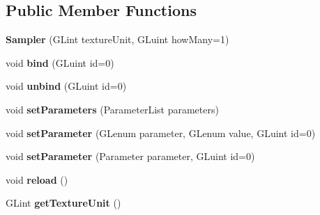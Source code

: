 \subsection*{Public Member Functions}
\begin{DoxyCompactItemize}
\item 
\hypertarget{classfillwave_1_1core_1_1Sampler_a10488b331fc0216c694fd8144d8ff38b}{}{\bfseries Sampler} (G\+Lint texture\+Unit, G\+Luint how\+Many=1)\label{classfillwave_1_1core_1_1Sampler_a10488b331fc0216c694fd8144d8ff38b}

\item 
\hypertarget{classfillwave_1_1core_1_1Sampler_ae5098e4e8df2bb3de2be700207a90ba7}{}void {\bfseries bind} (G\+Luint id=0)\label{classfillwave_1_1core_1_1Sampler_ae5098e4e8df2bb3de2be700207a90ba7}

\item 
\hypertarget{classfillwave_1_1core_1_1Sampler_ad49ae1cadd157b6a61189e4a3a483322}{}void {\bfseries unbind} (G\+Luint id=0)\label{classfillwave_1_1core_1_1Sampler_ad49ae1cadd157b6a61189e4a3a483322}

\item 
\hypertarget{classfillwave_1_1core_1_1Sampler_a59b0527350b74fd14a8bd96735d60925}{}void {\bfseries set\+Parameters} (Parameter\+List parameters)\label{classfillwave_1_1core_1_1Sampler_a59b0527350b74fd14a8bd96735d60925}

\item 
\hypertarget{classfillwave_1_1core_1_1Sampler_a39a21e4b22cd69868f4c2ea2f12ab630}{}void {\bfseries set\+Parameter} (G\+Lenum parameter, G\+Lenum value, G\+Luint id=0)\label{classfillwave_1_1core_1_1Sampler_a39a21e4b22cd69868f4c2ea2f12ab630}

\item 
\hypertarget{classfillwave_1_1core_1_1Sampler_a4a413c60612fe8bb2b9adcb50efa8244}{}void {\bfseries set\+Parameter} (Parameter parameter, G\+Luint id=0)\label{classfillwave_1_1core_1_1Sampler_a4a413c60612fe8bb2b9adcb50efa8244}

\item 
\hypertarget{classfillwave_1_1core_1_1Sampler_a486af72958037109ad9510d2b352ad1a}{}void {\bfseries reload} ()\label{classfillwave_1_1core_1_1Sampler_a486af72958037109ad9510d2b352ad1a}

\item 
\hypertarget{classfillwave_1_1core_1_1Sampler_ab15ce50dc694f68a4974e9a7f5881f26}{}G\+Lint {\bfseries get\+Texture\+Unit} ()\label{classfillwave_1_1core_1_1Sampler_ab15ce50dc694f68a4974e9a7f5881f26}

\end{DoxyCompactItemize}
